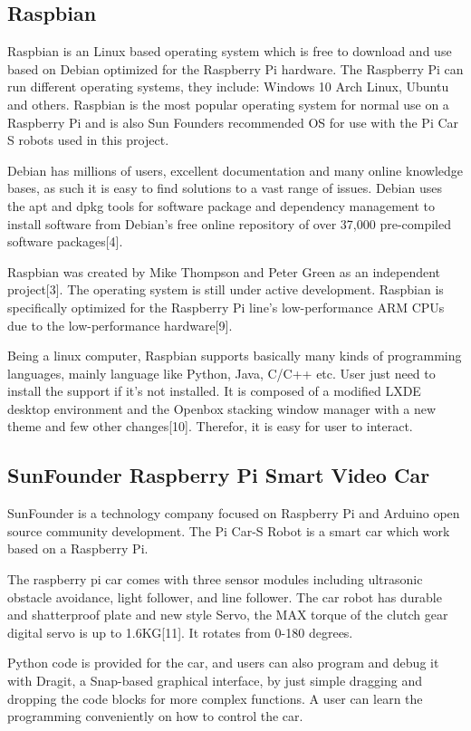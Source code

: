 \documentclass{mproj}
\begin{document}
\subsection{Raspbian}
Raspbian is an Linux based operating system which is free to download and use based on Debian optimized for the Raspberry Pi hardware. The Raspberry Pi can run different operating systems, they include: Windows 10 Arch Linux, Ubuntu and others. Raspbian is the most popular operating system for normal use on a Raspberry Pi and is also Sun Founders recommended OS for use with the Pi Car S robots used in this project. 

Debian has millions of users, excellent documentation and many online knowledge bases, as such it is easy to find solutions to a vast range of issues. Debian uses the apt and dpkg tools for software package and dependency management to install software from Debian's free online repository of over 37,000 pre-compiled software packages[4].

Raspbian was created by Mike Thompson and Peter Green as an independent project[3]. The operating system is still under active development. Raspbian is specifically optimized for the Raspberry Pi line's low-performance ARM CPUs due to the low-performance hardware[9]. 

Being a linux computer, Raspbian supports basically many kinds of programming languages, mainly language like Python, Java, C/C++ etc. User just need to install the support if it's not installed. It is composed of a modified LXDE desktop environment and the Openbox stacking window manager with a new theme and few other changes[10]. Therefor, it is easy for user to interact. 

\subsection{SunFounder Raspberry Pi Smart Video Car }

SunFounder is a technology company focused on Raspberry Pi and Arduino open source
community development. The Pi Car-S Robot is a smart car which work based on a Raspberry Pi.

The raspberry pi car comes with three sensor modules including ultrasonic obstacle avoidance, light follower, and line follower. The car robot has durable and shatterproof plate and new style Servo, the MAX torque of the clutch gear digital servo is up to 1.6KG[11]. It rotates from 0-180 degrees.

Python code is provided for the car, and users can also program and debug it with Dragit, a Snap-based graphical interface, by just simple dragging and dropping the code blocks for more complex functions. A user can learn the programming conveniently on how to control the car.
\end{document}
